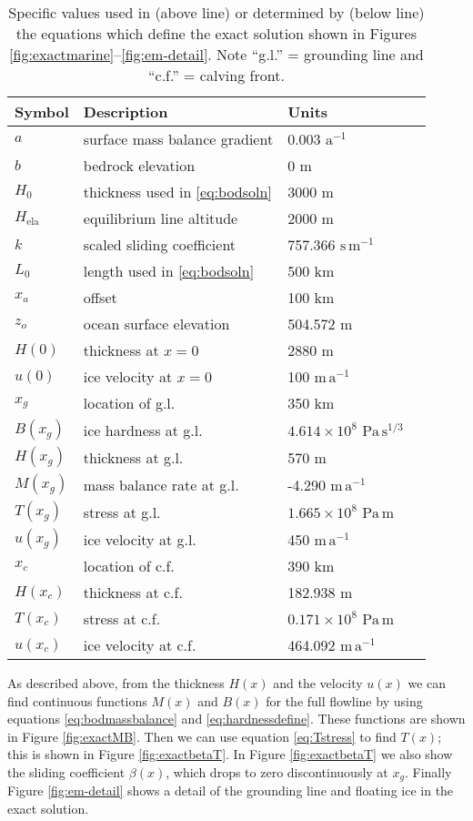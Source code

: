 \documentclass[twocolumn]{igs}
\newcommand{\Hela}{H_{\text{ela}}}
\begin{document}
\begin{table}
\caption{Specific values used in (above line) or determined by (below line) the equations which define the exact solution shown in Figures \ref{fig:exactmarine}--\ref{fig:em-detail}.  Note ``g.l.'' = grounding line and ``c.f.'' = calving front.}\label{tab:exactsoln}

\medskip
\begin{tabular}{llll}
Symbol & Description & Units \\ \hline
$a$ & surface mass balance gradient & 0.003 $\text{a}^{-1}$ \\
$b$ & bedrock elevation & 0 m \\
$H_0$ & thickness used in \eqref{eq:bodsoln} & 3000 m  \\
$\Hela$ & equilibrium line altitude & 2000 m  \\
$k$ & scaled sliding coefficient & 757.366 $\text{s}\,\text{m}^{-1}$ \\
$L_0$ & length used in \eqref{eq:bodsoln} & 500 km  \\
$x_a$ & offset & 100 km  \\
$z_o$ & ocean surface elevation & 504.572 m \\
$H(0)$ & thickness at $x=0$ & 2880 m  \\
$u(0)$ & ice velocity at $x=0$ & 100 $\text{m}\,\text{a}^{-1}$  \\ \hline
$x_g$ & location of g.l. & 350 km  \\
$B(x_g)$ & ice hardness at g.l. & $4.614 \times 10^{8}$ $\text{Pa}\,\text{s}^{1/3}$  \\
$H(x_g)$ & thickness at g.l. & 570 m  \\
$M(x_g)$ & mass balance rate at g.l. & -4.290 $\text{m}\,\text{a}^{-1}$  \\
$T(x_g)$ & stress at g.l. & $1.665 \times 10^{8}$ $\text{Pa}\,\text{m}$  \\
$u(x_g)$ & ice velocity at g.l. & 450 $\text{m}\,\text{a}^{-1}$  \\
$x_c$ & location of c.f. & 390 km  \\
$H(x_c)$ & thickness at c.f. & 182.938 m  \\
$T(x_c)$ & stress at c.f. & $0.171 \times 10^{8}$ $\text{Pa}\,\text{m}$  \\
$u(x_c)$ & ice velocity at c.f. & 464.092 $\text{m}\,\text{a}^{-1}$  \\
\end{tabular}
\end{table}

As described above, from the thickness $H(x)$ and the velocity $u(x)$ we can find continuous functions $M(x)$ and $B(x)$ for the full  flowline by using equations \eqref{eq:bodmassbalance} and \eqref{eq:hardnessdefine}.  These functions are shown in Figure \ref{fig:exactMB}.  Then we can use equation \eqref{eq:Tstress} to find $T(x)$; this is shown in Figure \ref{fig:exactbetaT}.  In Figure \ref{fig:exactbetaT} we also show the sliding coefficient $\beta(x)$, which drops to zero discontinuously at $x_g$.  Finally Figure \ref{fig:em-detail} shows a detail of the grounding line and floating ice in the exact solution.
\end{document}
